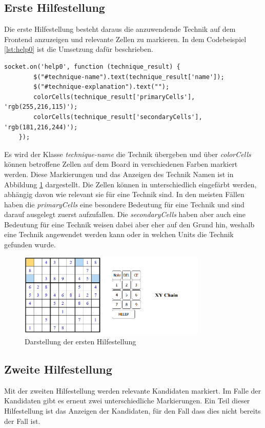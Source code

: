 \subsection{Erste Hilfestellung}

Die erste Hilfestellung besteht daraus die anzuwendende Technik auf dem Frontend anzuzeigen und relevante Zellen zu markieren.  In dem Codebeispiel \ref{lst:help0} ist die Umsetzung dafür beschrieben.

\begin{lstlisting}[caption={Erste Hilfestellung}, label={lst:help0}]
	socket.on('help0', function (technique_result) {
		$("#technique-name").text(technique_result['name']);
		$("#technique-explanation").text("");
		colorCells(technique_result['primaryCells'], 'rgb(255,216,115)');
		colorCells(technique_result['secondaryCells'], 'rgb(181,216,244)');
	});
\end{lstlisting}

Es wird der Klasse \textit{technique-name} die Technik übergeben und über \textit{colorCells} können betroffene Zellen auf dem Board in verschiedenen Farben markiert werden. Diese Markierungen und das Anzeigen des Technik Namen ist in Abbildung \ref{fig:Help1} dargestellt. Die Zellen können in unterschiedlich eingefärbt werden, abhängig davon wie relevant sie für eine Technik sind. In den meisten Fällen haben die \textit{primaryCells} eine besondere Bedeutung für eine Technik und sind darauf ausgelegt zuerst aufzufallen. Die \textit{secondaryCells} haben aber auch eine Bedeutung für eine Technik weisen dabei aber eher auf den Grund hin, weshalb eine Technik angewendet werden kann oder in welchen Units die Technik gefunden wurde.

\begin{figure}[htbp]
	\centering
	\includegraphics[width=0.8\textwidth]{images/Help1.png}
	\caption{Darstellung der ersten Hilfestellung}
	\label{fig:Help1}
\end{figure}

\subsection{Zweite Hilfestellung}
Mit der zweiten Hilfestellung werden relevante Kandidaten markiert. Im Falle der Kandidaten gibt es erneut zwei unterschiedliche Markierungen. Ein Teil dieser Hilfestellung ist das Anzeigen der Kandidaten, für den Fall dass dies nicht bereits der Fall ist. 

